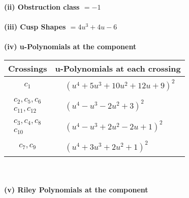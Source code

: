 \documentclass[1p]{elsarticle_modified}
\theoremstyle{definition}
\begin{document}
\flushleft \textbf{(ii) Obstruction class $= -1$}\\~\\
\flushleft \textbf{(iii) Cusp Shapes $= 4 u^3+4 u-6$}\\~\\
\newpage\renewcommand{\arraystretch}{1}
\flushleft \textbf{(iv) u-Polynomials at the component}\newline \\
\begin{tabular}{m{50pt}|m{274pt}}
Crossings & \hspace{64pt}u-Polynomials at each crossing \\
\hline $$\begin{aligned}c_{1}\end{aligned}$$&$\begin{aligned}
&(u^4+5 u^3+10 u^2+12 u+9)^2
\end{aligned}$\\
\hline $$\begin{aligned}c_{2},c_{5},c_{6}\\c_{11},c_{12}\end{aligned}$$&$\begin{aligned}
&(u^4- u^3-2 u^2+3)^2
\end{aligned}$\\
\hline $$\begin{aligned}c_{3},c_{4},c_{8}\\c_{10}\end{aligned}$$&$\begin{aligned}
&(u^4- u^3+2 u^2-2 u+1)^2
\end{aligned}$\\
\hline $$\begin{aligned}c_{7},c_{9}\end{aligned}$$&$\begin{aligned}
&(u^4+3 u^3+2 u^2+1)^2
\end{aligned}$\\
\hline
\end{tabular}\\~\\
\newpage\renewcommand{\arraystretch}{1}
\flushleft \textbf{(v) Riley Polynomials at the component}\newline \\
\end{document}
